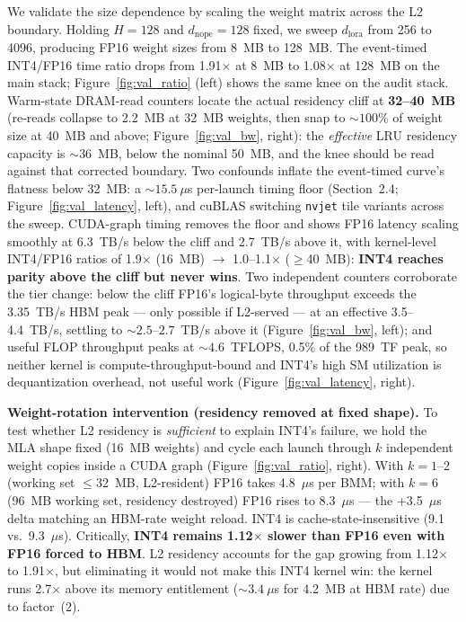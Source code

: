 \documentclass[10pt,twocolumn]{article}
\begin{document}
We validate the size dependence by scaling the weight matrix across the L2 boundary.  Holding $H{=}128$ and $d_\text{nope}{=}128$ fixed, we sweep $d_\text{lora}$ from 256 to 4096, producing FP16 weight sizes from 8~MB to 128~MB.  The event-timed INT4/FP16 time ratio drops from 1.91$\times$ at 8~MB to 1.08$\times$ at 128~MB on the main stack; Figure~\ref{fig:val_ratio} (left) shows the same knee on the audit stack.  Warm-state DRAM-read counters locate the actual residency cliff at \textbf{32--40~MB} (re-reads collapse to 2.2~MB at 32~MB weights, then snap to ${\sim}100\%$ of weight size at 40~MB and above; Figure~\ref{fig:val_bw}, right): the \emph{effective} LRU residency capacity is ${\sim}36$~MB, below the nominal 50~MB, and the knee should be read against that corrected boundary.  Two confounds inflate the event-timed curve's flatness below 32~MB: a ${\sim}15.5~\mu$s per-launch timing floor (Section~2.4; Figure~\ref{fig:val_latency}, left), and cuBLAS switching \texttt{nvjet} tile variants across the sweep.  CUDA-graph timing removes the floor and shows FP16 latency scaling smoothly at 6.3~TB/s below the cliff and 2.7~TB/s above it, with kernel-level INT4/FP16 ratios of 1.9$\times$ (16~MB) $\to$ 1.0--1.1$\times$ ($\geq$40~MB): \textbf{INT4 reaches parity above the cliff but never wins}.  Two independent counters corroborate the tier change: below the cliff FP16's logical-byte throughput exceeds the 3.35~TB/s HBM peak --- only possible if L2-served --- at an effective 3.5--4.4~TB/s, settling to ${\sim}2.5$--$2.7$~TB/s above it (Figure~\ref{fig:val_bw}, left); and useful FLOP throughput peaks at ${\sim}4.6$~TFLOPS, 0.5\% of the 989~TF peak, so neither kernel is compute-throughput-bound and INT4's high SM utilization is dequantization overhead, not useful work (Figure~\ref{fig:val_latency}, right).

\textbf{Weight-rotation intervention (residency removed at fixed shape).}  To test whether L2 residency is \emph{sufficient} to explain INT4's failure, we hold the MLA shape fixed (16~MB weights) and cycle each launch through $k$ independent weight copies inside a CUDA graph (Figure~\ref{fig:val_ratio}, right).  With $k{=}1$--$2$ (working set $\leq$32~MB, L2-resident) FP16 takes 4.8~$\mu$s per BMM; with $k{=}6$ (96~MB working set, residency destroyed) FP16 rises to 8.3~$\mu$s --- the +3.5~$\mu$s delta matching an HBM-rate weight reload.  INT4 is cache-state-insensitive (9.1 vs.\ 9.3~$\mu$s).  Critically, \textbf{INT4 remains 1.12$\times$ slower than FP16 even with FP16 forced to HBM}.  L2 residency accounts for the gap growing from 1.12$\times$ to 1.91$\times$, but eliminating it would not make this INT4 kernel win: the kernel runs 2.7$\times$ above its memory entitlement (${\sim}3.4~\mu$s for 4.2~MB at HBM rate) due to factor~(2).
\end{document}
